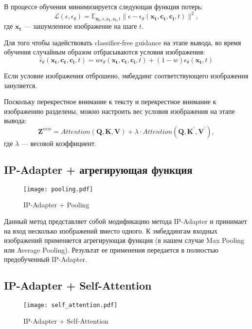 \documentclass{article}
\begin{document}
В процессе обучения минимизируется следующая функция потерь: 
\begin{equation}
\mathcal{L}(\epsilon, \epsilon_{\theta}) = \mathbb{E}_{\mathbf{x_t}, \epsilon, \mathbf{c_t}, \mathbf{c_i}, t} \|\epsilon - \epsilon_{\theta}(\mathbf{x_t}, \mathbf{c_t}, \mathbf{c_i}, t)\|^2,
\end{equation}
где $\mathbf{x_t}$ --- зашумленное изображение на шаге $t$.\par
Для того чтобы задействовать classifier-free guidance на этапе вывода, во время обучения случайным образом отбрасываются условия изображения: 
\begin{equation}
\hat{\epsilon}_{\theta}(\mathbf{x_t}, \mathbf{c_t}, \mathbf{c_i}, t) = w\epsilon_{\theta}(\mathbf{x_t}, \mathbf{c_t}, \mathbf{c_i}, t) + (1-w)\epsilon_{\theta}(\mathbf{x_t}, t)
\end{equation}

Если условие изображения отброшено, эмбеддинг соответствующего изображения зануляется. 

Поскольку перекрестное внимание к тексту и перекрестное внимание к изображению разделены, можно настроить вес условия изображения на этапе вывода: 
\begin{equation}
\mathbf{Z}^{new} = Attention(\mathbf{Q}, \mathbf{K}, \mathbf{V}) + \lambda \cdot Attention(\mathbf{Q}, \mathbf{K}^{\prime}, \mathbf{V}^{\prime}),
\end{equation}
где $\lambda$ --- весовой коэффициент. 

\subsection{IP-Adapter + агрегирующая функция}
\vspace{-45pt}
\begin{figure}[H]
    \centering
    \texttt{[image: pooling.pdf]}
    \caption{IP-Adapter + Pooling}
    \label{fig:pooling}
\end{figure}

Данный метод представляет собой модификацию метода IP-Adapter и принимает на вход несколько изображений вместо одного. К эмбеддингам входных изображений применяется агрегирующая функция (в нашем случае Max Pooling или Average Pooling)\cite{DBLP:journals/corr/abs-2009-07485}. Результат ее применения передается в полностью предобученный IP-Adapter.

\subsection{IP-Adapter + Self-Attention}
\vspace{-20pt}
\begin{figure}[h]
    \centering
    \texttt{[image: self\_attention.pdf]}
    \caption{IP-Adapter + Self-Attention}
    \label{fig:self_attention}
\end{figure}
\end{document}
